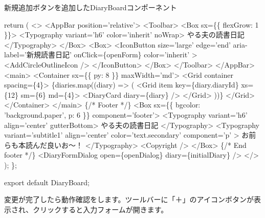 \begin{starterprogram}[]{新規追加ボタンを追加したDiaryBoardコンポーネント}
{    return (
      \textless{}\textgreater{}
        \textless{}AppBar position='relative'\textgreater{}
          \textless{}Toolbar\textgreater{}
            \textless{}Box sx=\{\{ flexGrow: 1 \}\}\textgreater{}
              \textless{}Typography variant='h6' color='inherit' noWrap\textgreater{}
                やる夫の読書日記
              \textless{}/Typography\textgreater{}
            \textless{}/Box\textgreater{}
            \textless{}Box\textgreater{}
              \textless{}IconButton
                size='large'
                edge='end'
                aria{-}label='新規読書日記'
                onClick=\{openForm\}
                color='inherit'
              \textgreater{}
                \textless{}AddCircleOutlineIcon /\textgreater{}
              \textless{}/IconButton\textgreater{}
            \textless{}/Box\textgreater{}
          \textless{}/Toolbar\textgreater{}
        \textless{}/AppBar\textgreater{}
        \textless{}main\textgreater{}
          \textless{}Container sx=\{\{ py: 8 \}\} maxWidth='md'\textgreater{}
            \textless{}Grid container spacing=\{4\}\textgreater{}
              \{diaries.map((diary) =\textgreater{} (
                \textless{}Grid item key=\{diary.diaryId\} xs=\{12\} sm=\{6\} md=\{4\}\textgreater{}
                  \textless{}DiaryCard diary=\{diary\} /\textgreater{}
                \textless{}/Grid\textgreater{}
              ))\}
            \textless{}/Grid\textgreater{}
          \textless{}/Container\textgreater{}
        \textless{}/main\textgreater{}
        \{/* Footer */\}
        \textless{}Box sx=\{\{ bgcolor: 'background.paper', p: 6 \}\} component='footer'\textgreater{}
          \textless{}Typography variant='h6' align='center' gutterBottom\textgreater{}
            やる夫の読書日記
          \textless{}/Typography\textgreater{}
          \textless{}Typography
            variant='subtitle1'
            align='center'
            color='text.secondary'
            component='p'
          \textgreater{}
            お前らも本読んだ良いお〜！
          \textless{}/Typography\textgreater{}
          \textless{}Copyright /\textgreater{}
        \textless{}/Box\textgreater{}
        \{/* End footer */\}
        \textless{}DiaryFormDialog open=\{openDialog\} diary=\{initialDiary\} /\textgreater{}
      \textless{}/\textgreater{}
    );
  \};

  export default DiaryBoard;
}\end{starterprogram}

変更が完了したら動作確認をします。ツールバーに「＋」のアイコンボタンが表示され、クリックすると入力フォームが開きます。

